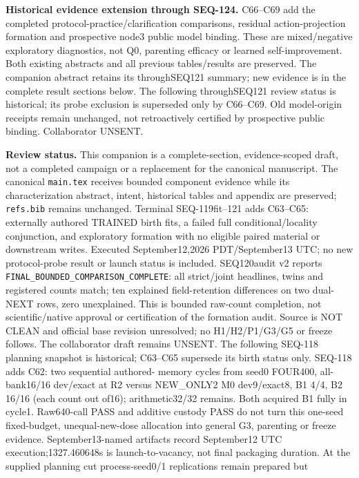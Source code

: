 \documentclass[11pt]{article}
\begin{document}
\noindent\textbf{Historical evidence extension through SEQ-124.} C66--C69 add the completed
protocol-practice/clarification comparisons, residual action-projection formation
and prospective node3 public model binding. These are mixed/negative exploratory
diagnostics, not Q0, parenting efficacy or learned self-improvement. Both existing
abstracts and all previous tables/results are preserved. The companion abstract
retains its throughSEQ121 summary; new evidence is in the complete result sections
below. The following throughSEQ121 review status is historical; its probe exclusion
is superseded only by C66--C69. Old model-origin receipts remain unchanged, not
retroactively certified by prospective public binding. Collaborator UNSENT.

\noindent\textbf{Review status.} This companion is a complete-section, evidence-scoped
draft, not a completed campaign or a replacement for the canonical manuscript.
The canonical \texttt{main.tex} receives bounded component evidence while its
characterization abstract, intent, historical tables and appendix are preserved;
\texttt{refs.bib} remains unchanged. Terminal SEQ-119fit--121 adds C63--C65:
externally authored TRAINED birth fits, a failed full conditional/locality
conjunction, and exploratory formation with no eligible paired material or
downstream writes. Executed September12,2026 PDT/September13 UTC; no new
protocol-probe result or launch status is included. SEQ120audit v2 reports
\texttt{FINAL\_BOUNDED\_COMPARISON\_COMPLETE}: all strict/joint headlines,
twins and registered counts match; ten explained field-retention differences
on two dual-NEXT rows, zero unexplained. This is bounded raw-count completion,
not scientific/native approval or certification of the formation audit.
Source is NOT CLEAN and official base revision unresolved; no H1/H2/P1/G3/G5
or freeze follows. The collaborator draft remains UNSENT. The following SEQ-118
planning snapshot is historical; C63--C65 supersede its birth status only.
SEQ-118 adds C62: two sequential authored-
memory cycles from seed0 FOUR400, all-bank16/16 dev/exact at R2 versus NEW\_ONLY2
M0 dev9/exact8, B1 4/4, B2 16/16 (each count out of16); arithmetic32/32 remains.
Both acquired B1 fully in cycle1. Raw640-call PASS and additive custody PASS do
not turn this one-seed fixed-budget, unequal-new-dose allocation into general G3,
parenting or freeze evidence. September13-named artifacts record September12 UTC
execution;1327.460648s is launch-to-vacancy, not final packaging duration.
At the supplied planning cut process-seed0/1 replications remain prepared but
\end{document}
